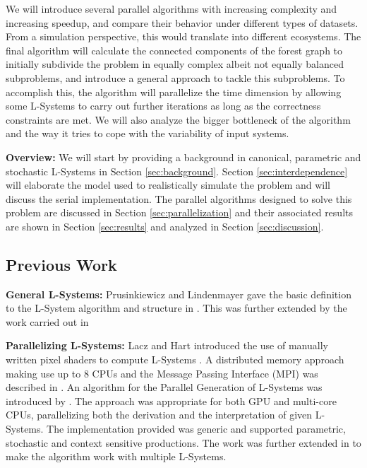 \documentclass[letterpaper,twoside,11pt]{article}
\begin{document}
\begin{multicols}{2}
We will introduce several parallel algorithms with increasing complexity and increasing speedup, and compare their behavior under different types of datasets. From a simulation perspective, this would translate into different ecosystems. The final algorithm will calculate the connected components of the forest graph to initially subdivide the problem in equally complex albeit not equally balanced subproblems, and introduce a general approach to tackle this subproblems. To accomplish this, the algorithm will parallelize the time dimension by allowing some L-Systems to carry out further iterations as long as the correctness constraints are met. We will also analyze the bigger bottleneck of the algorithm and the way it tries to cope with the variability of input systems.

\textbf{Overview:} We will start by providing a background in canonical, parametric and stochastic L-Systems in Section \ref{sec:background}. Section \ref{sec:interdependence} will elaborate the model used to realistically simulate the problem and will discuss the serial implementation. The parallel algorithms designed to solve this problem are discussed in Section \ref{sec:parallelization} and their associated results are shown in Section \ref{sec:results} and analyzed in Section \ref{sec:discussion}.

\subsection{Previous Work} %
\label{sub:previous_work}
\textbf{General L-Systems:} Prusinkiewicz and Lindenmayer gave the basic definition to the L-System algorithm and structure in \cite{Prusinkiewicz:1996:ABP:235579}. This was further extended by the work carried out in \cite{Parish:2001:PMC:383259.383292,Prusinkiewicz:1994:ST:192161.192254,Prusinkiewicz:2001:UPI:383259.383291}

\textbf{Parallelizing L-Systems:} Lacz and Hart introduced the use of manually written pixel shaders to compute L-Systems \cite{Lacz04proceduralgeometry}. A distributed memory approach making use up to 8 CPUs and the Message Passing Interface (MPI) was described in \cite{4392608}. An algorithm for the Parallel Generation of L-Systems was introduced by \cite{LIPP-2009-PGL}. The approach was appropriate for both GPU and multi-core CPUs, parallelizing both the derivation and the interpretation of given L-Systems. The implementation provided was generic and supported parametric, stochastic and context sensitive productions. The work was further extended in \cite{LIPP-2010-PGMS} to make the algorithm work with multiple L-Systems.


\end{multicols}
\end{document}
